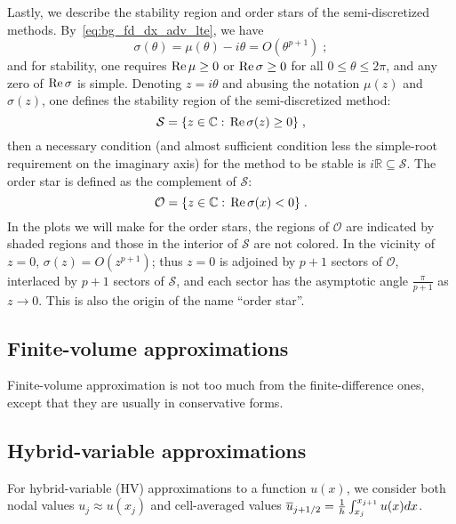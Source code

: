 Lastly, we describe the stability region and order stars of the semi-discretized methods.
By~\cref{eq:bg_fd_dx_adv_lte}, we have
\begin{equation}\label{eq:bg_fd_dx_mu_order}
  \sigma(\theta) = \mu(\theta) - i\theta = O(\theta^{p+1})\;;
\end{equation}
and for stability, one requires $\operatorname{Re}\mu\ge0$ or $\operatorname{Re}\sigma\ge0$ for all $0\le\theta\le2\pi$, and any zero of $\operatorname{Re}\sigma$ is simple.
Denoting $z=i\theta$ and abusing the notation $\mu(z)$ and $\sigma(z)$, one defines the stability region of the semi-discretized method:
\begin{equation}\label{eq:bg_fd_dx_mu_stab}
  \mathcal{S} = \{z\in\mathbb{C}:\,\operatorname{Re}\sigma(z)\ge0\}\;,
\end{equation}
then a necessary condition (and almost sufficient condition less the simple-root requirement on the imaginary axis) for the method to be stable is $i\mathbb{R}\subseteq\mathcal{S}$.
The order star is defined as the complement of $\mathcal{S}$:
\begin{equation}\label{eq:bg_fd_dx_mu_os}
  \mathcal{O} = \{z\in\mathbb{C}:\,\operatorname{Re}\sigma(x)<0\}\;.
\end{equation}
In the plots we will make for the order stars, the regions of $\mathcal{O}$ are indicated by shaded regions and those in the interior of $\mathcal{S}$ are not colored.
In the vicinity of $z=0$, $\sigma(z)=O(z^{p+1})$; thus $z=0$ is adjoined by $p+1$ sectors of $\mathcal{O}$, interlaced by $p+1$ sectors of $\mathcal{S}$, and each sector has the asymptotic angle $\frac{\pi}{p+1}$ as $z\to0$.
This is also the origin of the name ``order star''.

\subsection{Finite-volume approximations}
\label{sec:bg_fv}
Finite-volume approximation is not too much from the finite-difference ones, except that they are usually in conservative forms.

\subsection{Hybrid-variable approximations}
\label{sec:bg_hv}
For hybrid-variable (HV) approximations to a function $u(x)$, we consider both nodal values $u_j\approx u(x_j)$ and cell-averaged values $\overline{u}_{{{j}+1/2}}=\frac{1}{h}\int_{x_j}^{x_{j+1}}u(x)dx$.

